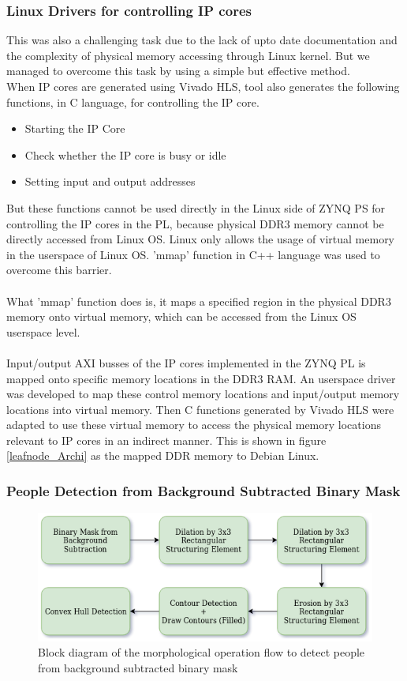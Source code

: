 \documentclass[12pt,a4paper]{report}
\begin{document}
\subsubsection{Linux Drivers for controlling IP cores}
This was also a challenging task due to the lack of upto date documentation and the complexity of physical memory accessing through Linux kernel. But we managed to overcome this task by using a simple but effective method.\\
When IP cores are generated using Vivado HLS, tool also generates the  following functions, in C language, for controlling the IP core.
\begin{itemize}
\item Starting the IP Core
\item Check whether the IP core is busy or idle
\item Setting input and output addresses
\end{itemize}
But these functions cannot be used directly in the Linux side of ZYNQ PS for controlling the IP cores in the PL, because physical DDR3 memory cannot be directly accessed from Linux OS. Linux only allows the usage of virtual memory in the userspace of Linux OS. 'mmap' function in C++ language was used to overcome this barrier.\\\\
What 'mmap' function does is, it maps a specified region in the physical DDR3 memory onto virtual memory, which can be accessed from the Linux OS userspace level. \\\\
Input/output AXI busses of the IP cores implemented in the ZYNQ PL is mapped onto specific memory locations in the DDR3 RAM. An userspace driver was developed to map these control memory locations and input/output memory locations into virtual memory. Then C functions generated by Vivado HLS were adapted to use these virtual memory to access the physical memory locations relevant to IP cores in an indirect manner. This is shown in figure \ref{leafnode_Archi} as the mapped DDR memory to Debian Linux.
\subsubsection{People Detection from Background Subtracted Binary Mask}

\begin{figure}[H]
\includegraphics[width=13cm]{morphology.png}
\centering
\caption{Block diagram of the morphological operation flow to detect people from background subtracted binary mask}
\label{morphology}
\end{figure}
\end{document}
